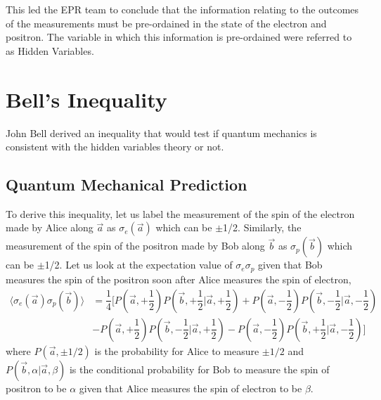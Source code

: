 \documentclass[aps,prb,onecolumn,notitlepage,showpacs,floatfix,superscriptaddress]{revtex4-1}
\begin{document}
This led the EPR team to conclude that the information relating to the outcomes of the measurements must be pre-ordained in the state of the electron and positron. The variable in which this information is pre-ordained were referred to as Hidden Variables.

\section{Bell's Inequality}
John Bell derived an inequality that would test if quantum mechanics is consistent with the hidden variables theory or not. \\

\subsection{Quantum Mechanical Prediction}
To derive this inequality, let us label the measurement of the spin of the electron made by Alice along $\vec{a}$ as $\sigma_e (\vec{a})$ which can be $\pm$1/2. Similarly, the measurement of the spin of the positron made by Bob along $\vec{b}$ as $\sigma_p (\vec{b})$ which can be $\pm$1/2. Let us look at the expectation value of $\sigma_e \sigma_p$ given that Bob measures the spin of the positron soon after Alice measures the spin of electron,
\begin{equation}
\begin{split}
\langle \sigma_e(\vec{a}) \sigma_p(\vec{b}) \rangle &= \dfrac{1}{4} \bigg[ P\left(\vec{a},+\dfrac{1}{2}\right) P\left(\vec{b},+\dfrac{1}{2} \bigg\vert \vec{a},+\dfrac{1}{2}\right) +  P\left(\vec{a},-\dfrac{1}{2}\right) P\left(\vec{b},-\dfrac{1}{2} \bigg\vert \vec{a},-\dfrac{1}{2}\right) \\
&- P\left(\vec{a},+\dfrac{1}{2}\right) P\left(\vec{b},-\dfrac{1}{2} \bigg\vert \vec{a},+\dfrac{1}{2}\right) - P\left(\vec{a},-\dfrac{1}{2}\right) P\left(\vec{b},+\dfrac{1}{2} \bigg\vert \vec{a},-\dfrac{1}{2}\right) \bigg]
\end{split}
\end{equation}
where $P(\vec{a},\pm 1/2)$ is the probability for Alice to measure $\pm 1/2$ and $P(\vec{b},\alpha \vert \vec{a},\beta)$ is the conditional probability for Bob to measure the spin of positron to be $\alpha$ given that Alice measures the spin of electron to be $\beta$.\\
\end{document}
